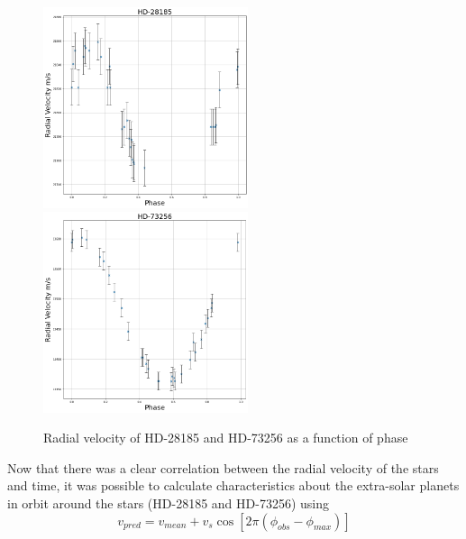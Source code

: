 \documentclass[]{article}
\begin{document}
\begin{figure}[h]
\includegraphics[width=6cm]{images/HD-28185_phase.png}
\includegraphics[width=6cm]{images/HD-73256_phase.png}
\caption{Radial velocity of HD-28185 and HD-73256 as a function of phase}
\label{fig:HD-_phase}
\end{figure}

Now that there was a clear correlation between the radial velocity of the stars and
time, it was possible to calculate characteristics about the extra-solar planets in 
orbit around the stars (HD-28185 and HD-73256) using 
\begin{equation}\label{eq:lab book eq2}
  v_{pred} = v_{mean}+v_s\cos[2\pi(\phi_{obs}-\phi_{max})]
\end{equation}
\end{document}
